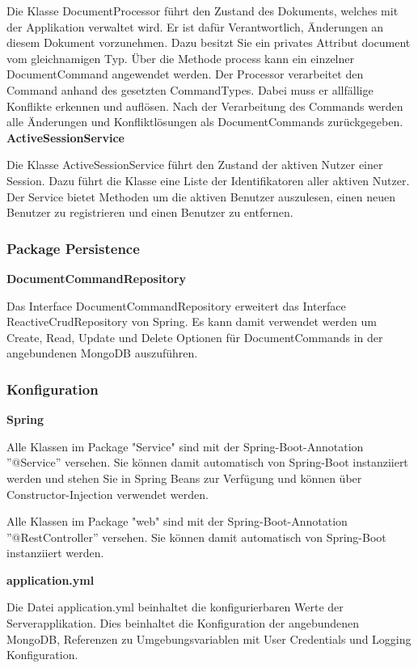 Die Klasse DocumentProcessor führt den Zustand des Dokuments, welches mit der Applikation verwaltet wird.
Er ist dafür Verantwortlich, Änderungen an diesem Dokument vorzunehmen.
Dazu besitzt Sie ein privates Attribut document vom gleichnamigen Typ.
Über die Methode process kann ein einzelner DocumentCommand angewendet werden.
Der Processor verarbeitet den Command anhand des gesetzten CommandTypes.
Dabei muss er allfällige Konflikte erkennen und auflösen.
Nach der Verarbeitung des Commands werden alle Änderungen und Konfliktlösungen als DocumentCommands zurückgegeben.
\clearpage
\textbf{ActiveSessionService}

Die Klasse ActiveSessionService führt den Zustand der aktiven Nutzer einer Session.
Dazu führt die Klasse eine Liste der Identifikatoren aller aktiven Nutzer.
Der Service bietet Methoden um die aktiven Benutzer auszulesen, einen neuen Benutzer zu registrieren und einen Benutzer zu entfernen.

\subsubsection{Package Persistence}

\textbf{DocumentCommandRepository}

Das Interface DocumentCommandRepository erweitert das Interface ReactiveCrudRepository von Spring.
Es kann damit verwendet werden um Create, Read, Update und Delete Optionen für DocumentCommands in der angebundenen MongoDB auszuführen.

\subsubsection{Konfiguration}

\textbf{Spring}

Alle Klassen im Package "Service" sind mit der Spring-Boot-Annotation ''@Service'' versehen.
Sie können damit automatisch von Spring-Boot instanziiert werden und stehen Sie in Spring Beans zur Verfügung und können über Constructor-Injection verwendet werden.

Alle Klassen im Package "web" sind mit der Spring-Boot-Annotation ''@RestController'' versehen.
Sie können damit automatisch von Spring-Boot instanziiert werden.

\textbf{application.yml}

Die Datei application.yml beinhaltet die konfigurierbaren Werte der Serverapplikation.
Dies beinhaltet die Konfiguration der angebundenen MongoDB, Referenzen zu Umgebungsvariablen mit User Credentials und Logging Konfiguration.

